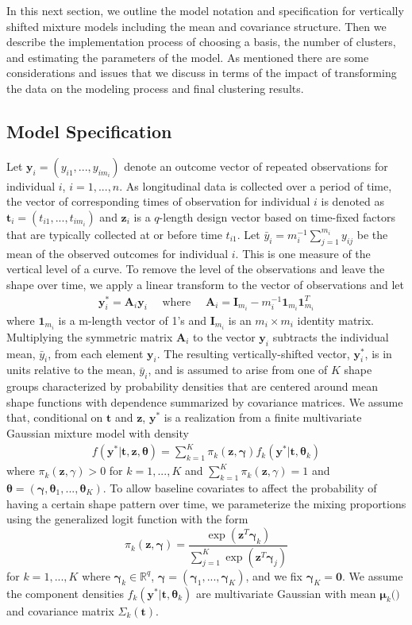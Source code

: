 \documentclass[12pt]{article}
\newcommand{\B}[0]{\mathbf}
\newcommand{\bs}[0]{\boldsymbol}
\begin{document}
In this next section, we outline the model notation and specification for vertically shifted mixture models including the mean and covariance structure. Then we describe the implementation process of choosing a basis, the number of clusters, and estimating the parameters of the model. As mentioned there are some considerations and issues that we discuss in terms of the impact of transforming the data on the modeling process and final clustering results. 
\subsection{Model Specification}
 Let $\B y_{i}=(y_{i1},...,y_{im_{i}})$ denote an outcome vector of repeated observations for individual $i$, $i=1,...,n$. As longitudinal data is collected over a period of time, the vector of corresponding times of observation for individual $i$ is denoted as $\B t_{i}=(t_{i1},...,t_{im_{i}})$ and $\B z_{i}$ is a $q$-length design vector based on time-fixed factors that are typically collected at or before time $t_{i1}$. Let $\bar{y}_{i}= m_{i}^{-1}\sum^{m_{i}}_{j=1} y_{ij}$ be the mean of the observed outcomes for individual $i$. This is one measure of the vertical level of a curve. To remove the level of the observations and leave the shape over time, we apply a linear transform to the vector of observations and let
\begin{align*}
\B y^{*}_{i} = \B A_{i}\B y_{i}\quad\text{ where }\quad \B A_{i} =\B I_{m_{i}} - m_{i}^{-1}\B 1_{m_{i}}\B 1_{m_{i}}^{T}
\end{align*}
where $\B 1_{m_{i}}$ is a m-length vector of 1's and $\B I_{m_{i}}$ is an $m_{i}\times m_{i}$ identity matrix. Multiplying the symmetric matrix $\B A_{i}$ to the vector $\B y_{i}$ subtracts the individual mean, $\bar{y}_{i}$, from each element $\B y_{i}$. The resulting vertically-shifted vector, $\B y^{*}_{i}$, is in units relative to the mean, $\bar{y}_{i}$, and is assumed to arise from one of $K$ shape groups characterized by probability densities that are centered around mean shape functions with dependence summarized by covariance matrices. We assume that, conditional on $\B t$ and $\B z$, $\B y^{*}$ is a realization from a finite multivariate Gaussian mixture model with density
\begin{align*}
 f(\B y^{*}|\B t,\B z,\bs\theta) =  \sum^{K}_{k=1}\pi_{k}(\B z, \bs\gamma)f_{k}( \B y^{*}|\B t,\bs\theta_{k})\label{mixmodel}
\end{align*}
where $\pi_{k}(\B z,\gamma)>0$ for $k=1,...,K$ and $\sum^{K}_{k=1}\pi_{k}(\B z,\gamma)=1$ and $\bs\theta = (\bs\gamma,\bs\theta_{1},...,\bs\theta_{K})$. To allow baseline covariates to affect the probability of having a certain shape pattern over time, we parameterize the mixing proportions using the generalized logit function with the form
$$\pi_{k}(\B z,\bs\gamma)=\frac{\exp(\B z^{T}\bs\gamma_{k})}{\sum_{j=1}^{K}\exp(\B z^{T}\bs\gamma_{j})}$$ 
for $k=1,...,K$ where $\bs \gamma_{k}\in\mathbb{R}^{q}$, $\bs\gamma = (\bs\gamma_{1},...,\bs\gamma_{K})$, and we fix $\bs\gamma_{K}=\B 0$. We assume the component densities $f_{k}(\B y^{*}|\B t,\bs\theta_{k})$ are multivariate Gaussian with mean $\bs\mu_{k}(\B )$ and covariance matrix $\Sigma_{k}(\B t)$.
\end{document}
